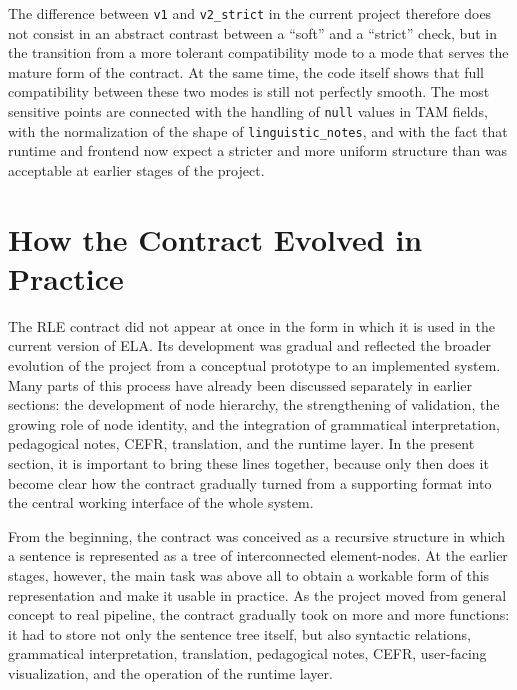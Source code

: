 \documentclass[12pt,a4paper,oneside]{report}
\begin{document}
The difference between \texttt{v1} and \texttt{v2\_strict} in the current project therefore does not consist in an abstract contrast between a “soft” and a “strict” check, but in the transition from a more tolerant compatibility mode to a mode that serves the mature form of the contract. At the same time, the code itself shows that full compatibility between these two modes is still not perfectly smooth. The most sensitive points are connected with the handling of \texttt{null} values in TAM fields, with the normalization of the shape of \texttt{linguistic\_notes}, and with the fact that runtime and frontend now expect a stricter and more uniform structure than was acceptable at earlier stages of the project.

\section{How the Contract Evolved in Practice}
The RLE contract did not appear at once in the form in which it is used in the current version of ELA. Its development was gradual and reflected the broader evolution of the project from a conceptual prototype to an implemented system. Many parts of this process have already been discussed separately in earlier sections: the development of node hierarchy, the strengthening of validation, the growing role of node identity, and the integration of grammatical interpretation, pedagogical notes, CEFR, translation, and the runtime layer. In the present section, it is important to bring these lines together, because only then does it become clear how the contract gradually turned from a supporting format into the central working interface of the whole system.

From the beginning, the contract was conceived as a recursive structure in which a sentence is represented as a tree of interconnected element-nodes. At the earlier stages, however, the main task was above all to obtain a workable form of this representation and make it usable in practice. As the project moved from general concept to real pipeline, the contract gradually took on more and more functions: it had to store not only the sentence tree itself, but also syntactic relations, grammatical interpretation, translation, pedagogical notes, CEFR, user-facing visualization, and the operation of the runtime layer.
\end{document}
